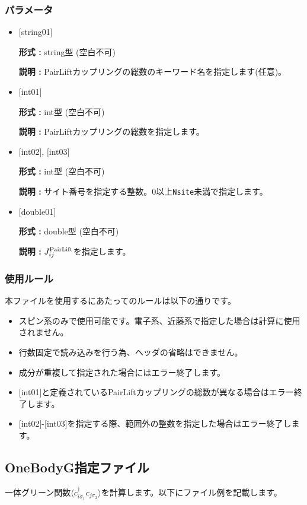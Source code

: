\subsubsection{パラメータ}
 \begin{itemize}

   \item  $[$string01$]$
   
    {\bf 形式 :} string型 (空白不可)

   {\bf 説明 :} PairLiftカップリングの総数のキーワード名を指定します(任意)。

   \item  $[$int01$]$
   
    {\bf 形式 :} int型 (空白不可)

   {\bf 説明 :} PairLiftカップリングの総数を指定します。

  \item  $[$int02$]$, $[$int03$]$
  
 {\bf 形式 :} int型 (空白不可)

{\bf 説明 :} サイト番号を指定する整数。0以上\verb|Nsite|{未満}で指定します。
 
 \item  $[$double01$]$
   
   {\bf 形式 :} double型 (空白不可)

  {\bf 説明 :}  $J_{ij}^{\rm PairLift}$を指定します。
  
\end{itemize}

\subsubsection{使用ルール}
本ファイルを使用するにあたってのルールは以下の通りです。
\begin{itemize}
\item スピン系のみで使用可能です。電子系、近藤系で指定した場合は計算に使用されません。
\item 行数固定で読み込みを行う為、ヘッダの省略はできません。
\item 成分が重複して指定された場合にはエラー終了します。
\item $[$int01$]$と定義されているPairLiftカップリングの総数が異なる場合はエラー終了します。
\item $[$int02$]$-$[$int03$]$を指定する際、範囲外の整数を指定した場合はエラー終了します。
\end{itemize}

\newpage
\subsection{OneBodyG指定ファイル}
\label{Subsec:onebodyg}
一体グリーン関数$\langle c_{i\sigma_1}^{\dagger}c_{j\sigma_2}\rangle$を計算します。以下にファイル例を記載します。

